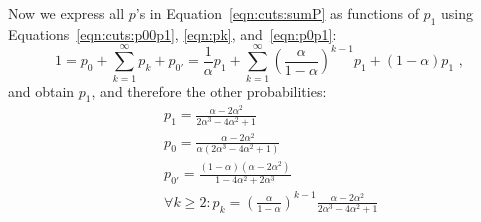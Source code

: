 \documentclass[letterpaper]{llncs}
\begin{document}
Now we express all $p$'s in Equation~\ref{eqn:cuts:sumP} as functions of $p_1$ using Equations~\ref{eqn:cuts:p00p1}, \ref{eqn:pk}, and~\ref{eqn:p0p1}: 
\begin{equation*}
1 = p_0 + \sum_{k=1}^\infty p_k + p_{0'} = 
\frac{1}{\alpha} p_1 + \sum_{k=1}^\infty \left( \frac{\alpha}{1-\alpha} \right)^{k-1} p_1 + (1 - \alpha) p_1 \label{eqn:p1Func} \,\, , 
\end{equation*} 
and obtain $p_1$, and therefore the other probabilities: 
\begin{eqnarray}
&& p_1 = \frac{\alpha-2 \alpha^2}{2\alpha^3 - 4\alpha^2 + 1} \\
&& p_0 = \frac{\alpha-2 \alpha^2}{\alpha(2\alpha^3 - 4\alpha^2 + 1)} \\
&& p_{0'} = \frac{(1 - \alpha)(\alpha - 2 \alpha^2)}{1 - 4\alpha^2 + 2\alpha^3} \\
&& \forall k \ge 2: p_k =  \left( \frac{\alpha}{1-\alpha} \right)^{k-1} \frac{\alpha-2 \alpha^2}{2\alpha^3 - 4\alpha^2 + 1}
\end{eqnarray} 
\end{document}
